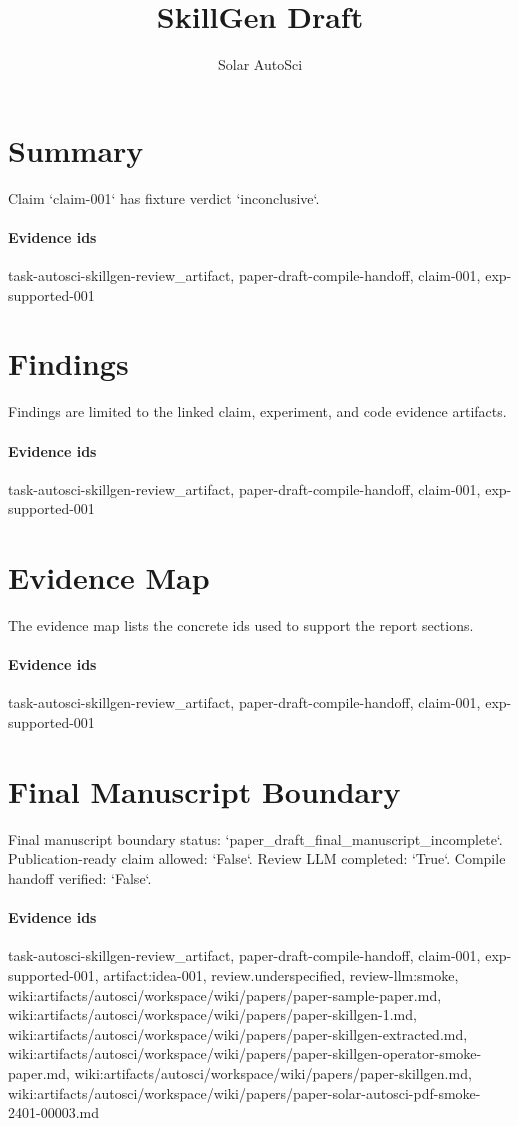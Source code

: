 \documentclass{article}
\title{SkillGen Draft}
\author{Solar AutoSci}
\date{}
\begin{document}
\maketitle

\section{Summary}
Claim `claim-001` has fixture verdict `inconclusive`.

\paragraph{Evidence ids} task-autosci-skillgen-review\_artifact, paper-draft-compile-handoff, claim-001, exp-supported-001

\section{Findings}
Findings are limited to the linked claim, experiment, and code evidence artifacts.

\paragraph{Evidence ids} task-autosci-skillgen-review\_artifact, paper-draft-compile-handoff, claim-001, exp-supported-001

\section{Evidence Map}
The evidence map lists the concrete ids used to support the report sections.

\paragraph{Evidence ids} task-autosci-skillgen-review\_artifact, paper-draft-compile-handoff, claim-001, exp-supported-001

\section{Final Manuscript Boundary}
Final manuscript boundary status: `paper\_draft\_final\_manuscript\_incomplete`. Publication-ready claim allowed: `False`. Review LLM completed: `True`. Compile handoff verified: `False`.

\paragraph{Evidence ids} task-autosci-skillgen-review\_artifact, paper-draft-compile-handoff, claim-001, exp-supported-001, artifact:idea-001, review.underspecified, review-llm:smoke, wiki:artifacts/autosci/workspace/wiki/papers/paper-sample-paper.md, wiki:artifacts/autosci/workspace/wiki/papers/paper-skillgen-1.md, wiki:artifacts/autosci/workspace/wiki/papers/paper-skillgen-extracted.md, wiki:artifacts/autosci/workspace/wiki/papers/paper-skillgen-operator-smoke-paper.md, wiki:artifacts/autosci/workspace/wiki/papers/paper-skillgen.md, wiki:artifacts/autosci/workspace/wiki/papers/paper-solar-autosci-pdf-smoke-2401-00003.md
\end{document}
